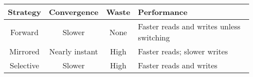
\begin{table}[t]
\small
\center
   \begin{tabular}{@{}c|c|c|C{25mm}@{}}
      \textbf{Strategy} & \textbf{Convergence} & \textbf{Waste} &
      \textbf{Performance} \\
      \midrule
      Forward   & Slower       & None & Faster reads and writes unless switching
      \\\hline
      Mirrored  & Nearly instant & High & Faster reads; slower writes \\
      \hline
      Selective & Slower       & High & Faster reads and writes  \\
   \end{tabular}

\end{table}





